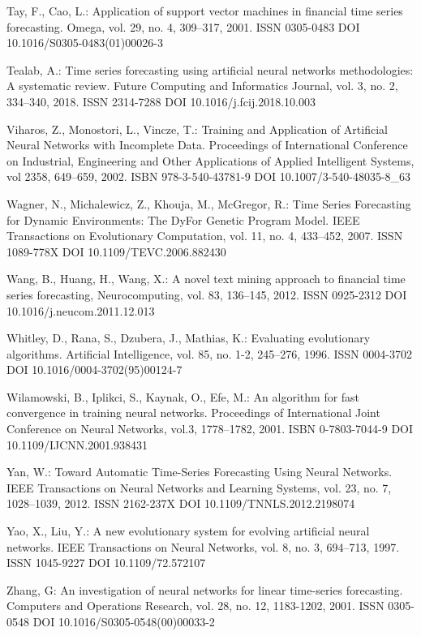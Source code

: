\begin{thebibliography}{99.}
 Tay, F., Cao, L.: Application of support vector machines in financial time series forecasting. Omega, vol. 29, no. 4, 309--317, 2001. ISSN 0305-0483 DOI 10.1016/S0305-0483(01)00026-3

 Tealab, A.: Time series forecasting using artificial neural networks methodologies: A systematic review. Future Computing and Informatics Journal, vol. 3, no. 2, 334--340, 2018. ISSN 2314-7288 DOI 10.1016/j.fcij.2018.10.003

 Viharos, Z., Monostori, L., Vincze, T.: Training and Application of Artificial Neural Networks with Incomplete Data. Proceedings of International Conference on Industrial, Engineering and Other Applications of Applied Intelligent Systems, vol 2358, 649--659, 2002. ISBN 978-3-540-43781-9 DOI 10.1007/3-540-48035-8\_63

 Wagner, N., Michalewicz, Z., Khouja, M., McGregor, R.: Time Series Forecasting for Dynamic Environments: The DyFor Genetic Program Model. IEEE Transactions on Evolutionary Computation, vol. 11, no. 4, 433--452, 2007. ISSN 1089-778X DOI 10.1109/TEVC.2006.882430

 Wang, B., Huang, H., Wang, X.: A novel text mining approach to financial time series forecasting, Neurocomputing, vol. 83, 136--145, 2012. ISSN 0925-2312 DOI 10.1016/j.neucom.2011.12.013

 Whitley, D., Rana, S., Dzubera, J., Mathias, K.: Evaluating evolutionary algorithms. Artificial Intelligence, vol. 85, no. 1-2, 245--276, 1996. ISSN 0004-3702 DOI 10.1016/0004-3702(95)00124-7

 Wilamowski, B., Iplikci, S., Kaynak, O., Efe, M.: An algorithm for fast convergence in training neural networks. Proceedings of International Joint Conference on Neural Networks, vol.3, 1778--1782, 2001. ISBN 0-7803-7044-9 DOI 10.1109/IJCNN.2001.938431

 Yan, W.: Toward Automatic Time-Series Forecasting Using Neural Networks. IEEE Transactions on Neural Networks and Learning Systems, vol. 23, no. 7, 1028--1039, 2012. ISSN 2162-237X DOI 10.1109/TNNLS.2012.2198074

 Yao, X., Liu, Y.: A new evolutionary system for evolving artificial neural networks. IEEE Transactions on Neural Networks, vol. 8, no. 3, 694--713, 1997. ISSN 1045-9227 DOI 10.1109/72.572107

 Zhang, G: An investigation of neural networks for linear time-series forecasting. Computers and Operations Research, vol. 28, no. 12, 1183-1202, 2001. ISSN 0305-0548 DOI 10.1016/S0305-0548(00)00033-2


\end{thebibliography}
